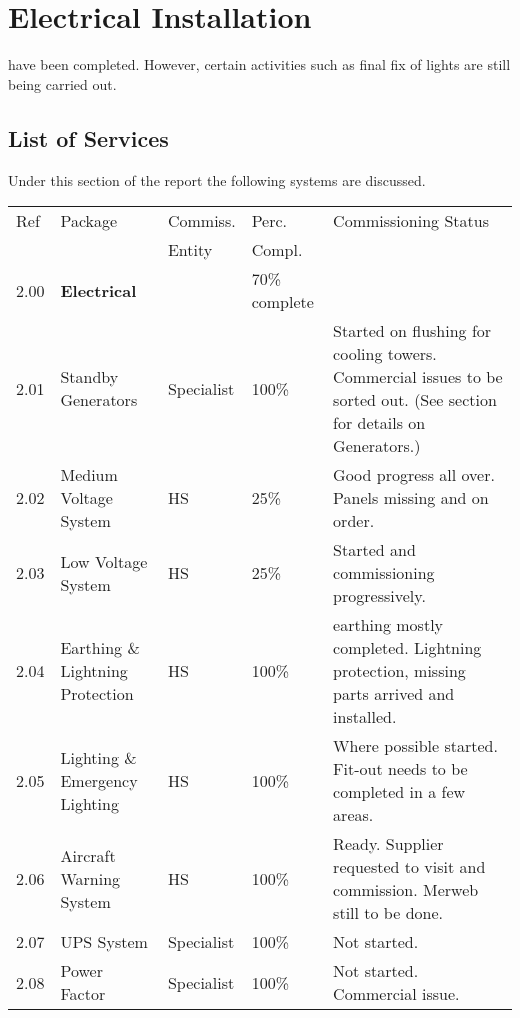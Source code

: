 \chapter{Electrical Installation}
\label{ch:electrical}

 have been completed. However, certain activities such as final fix of lights are still being carried out.  

\section{List of Services}
Under this section of the report the following systems are discussed.

\bgroup
\small
\label{chap:listofservices}

\begin{longtable}{llllp{3.9cm}}
\toprule
Ref	&Package	&Commiss.	&Perc. & Commissioning Status\\
     &         &Entity    &Compl.\\
\midrule
\midrule
2.00	&\textbf{Electrical}		&& 70\% complete\\
2.01	&Standby Generators	&Specialist&100\% & Started on flushing for cooling towers. Commercial issues to be sorted out. (See section for details on Generators.)\\	
2.02	&Medium Voltage System	&HS&25\% & Good progress all over. Panels missing and on order.\\	
2.03	&Low Voltage System		&HS&25\% & Started and commissioning progressively.\\
2.04	&Earthing \& Lightning Protection &HS&100\% &earthing mostly completed. Lightning protection, missing parts arrived and installed. \\		
2.05	&Lighting \& Emergency Lighting  &HS&100\% & Where possible started. Fit-out needs to be completed in a few areas.\\		
2.06	&Aircraft Warning System &HS&100\% & Ready. Supplier requested to visit and commission. Merweb still to be done.\\		
2.07	&UPS System	&Specialist&100\% & Not started.\\	
2.08 &Power Factor  &Specialist &100\% & Not started. Commercial issue.\\
\midrule
\end{longtable}
\egroup



